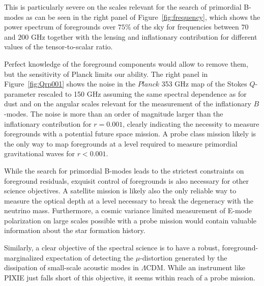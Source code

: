 This is particularly severe on the scales relevant for the search of primordial B-modes as can be seen in the right panel of Figure~\ref{fig:frequency}, which shows the power spectrum of foregrounds over $75\%$ of the sky for frequencies between $70$ and $200$ GHz together with the lensing and inflationary contribution for different values of the tensor-to-scalar ratio.

Perfect knowledge of the foreground components would allow to remove them, but the sensitivity of Planck limits our ability. The right panel in Figure~\ref{fig:Qrp001} shows the noise in the $Planck$ 353 GHz map of the Stokes $Q$-parameter rescaled to 150 GHz assuming the same spectral dependence as for dust and on the angular scales relevant for the measurement of the inflationary $B$-modes. The noise is more than an order of magnitude larger than the inflationary contribution for $r=0.001$, clearly indicating the necessity to measure foregrounds with a potential future space mission. A probe class mission likely is the only way to map foregrounds at a level required to measure primordial gravitational waves for $r<0.001$. 

While the search for primordial B-modes leads to the strictest constraints on foreground residuals, exquisit control of foregrounds is also necessary for other science objectives. A satellite mission is likely also the only reliable way to measure the optical depth at a level necessary to break the degeneracy with the neutrino mass. Furthermore, a cosmic variance limited measurement of E-mode polarization on large scales possible with a probe mission would contain valuable information about the star formation history. 

Similarly, a clear objective of the spectral science is to have a robust, foreground-marginalized expectation of detecting the $\mu$-distortion generated by the dissipation of small-scale acoustic modes in $\Lambda$CDM. While an instrument like PIXIE just falls short of this objective, it seems within reach of a probe mission.

